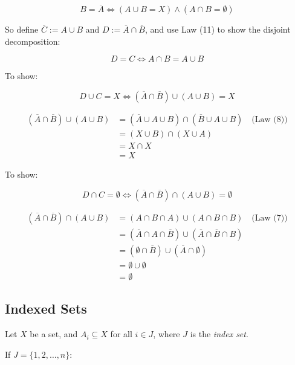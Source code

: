 \[
	B = \overline{A} \iff (A \cup B = X) \land (A \cap B = \emptyset)
\]

So define \( \overline{C} := A \cup B \) and \( D := \overline{A} \cap \overline{B} \),
and use Law (11) to show the disjoint decomposition:

\[
	D = C \iff A \cap B = A \cup B
\]

To show:

\[
	D \cup C = X \iff (\overline{A} \cap \overline{B}) \cup (A \cup B) = X
\]

\begin{align*}
	(\overline{A} \cap \overline{B}) \cup (A \cup B)
	 & = (\overline{A} \cup A \cup B) \cap (\overline{B} \cup A \cup B) \quad \text{(Law (8))} \\
	 & = (X \cup B) \cap (X \cup A)                                                            \\
	 & = X \cap X                                                                              \\
	 & = X
\end{align*}

To show:

\[
	D \cap C = \emptyset \iff (\overline{A} \cap \overline{B}) \cap (A \cup B) = \emptyset
\]

\begin{align*}
	(\overline{A} \cap \overline{B}) \cap (A \cup B)
	 & = (A \cap B \cap A) \cup (A \cap B \cap B) \quad \text{(Law (7))}                      \\
	 & = (\overline{A} \cap A \cap \overline{B}) \cup (\overline{A} \cap \overline{B} \cap B) \\
	 & = (\emptyset \cap \overline{B}) \cup (\overline{A} \cap \emptyset)                     \\
	 & = \emptyset \cup \emptyset                                                             \\
	 & = \emptyset
\end{align*}

\QED

\subsection{Indexed Sets}

Let \( X \) be a set, and \( A_i \subseteq X \) for all \( i \in J \), where \( J \) is the 
\emph{index set}.
\vspace{\baselineskip}

If \( J = \{1, 2, \dots, n\} \):


